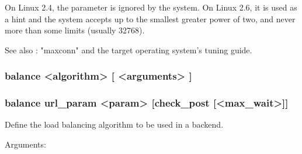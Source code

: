   On Linux 2.4, the parameter is ignored by the system. On Linux 2.6, it is
  used as a hint and the system accepts up to the smallest greater power of
  two, and never more than some limits (usually 32768).

  See also : "maxconn" and the target operating system's tuning guide.

\subsubsection[balance] {
balance <algorithm> [ <arguments> ]
}
\subsubsection*{
balance url\_param <param> [check\_post [<max\_wait>]]
}

  Define the load balancing algorithm to be used in a backend.

  
  Arguments:
